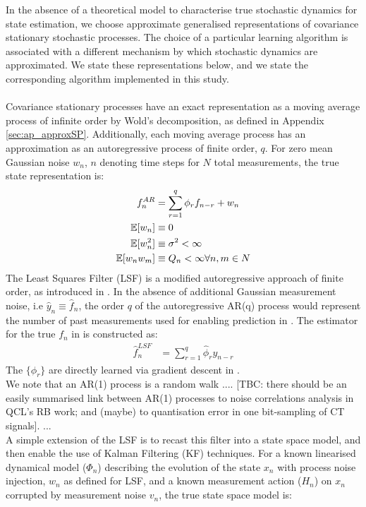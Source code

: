 In the absence of a theoretical model to characterise true stochastic dynamics for state estimation, we choose approximate generalised representations of covariance stationary stochastic processes. The choice of a particular learning algorithm is associated with a different mechanism by which stochastic dynamics are approximated. We state these representations below, and we state the corresponding algorithm implemented in this study. 
\\
\\
Covariance stationary processes have an exact representation as a moving average process of infinite order by Wold's decomposition, as defined in Appendix \ref{sec:ap_approxSP}. Additionally, each moving average process has an approximation as an autoregressive process of finite order, $q$. For zero mean Gaussian noise $w_n$, $n$ denoting time steps for $N$ total measurements, the true state representation is:
\begin{align}
f_n^{AR} & = \sum_{r=1}^{q} \phi_r f_{n-r}  + w_n\label{eqn:main:f_true_AR}  \\
\mathbb{E}[w_n] &\equiv 0 \\
\mathbb{E}[w_n^2] &\equiv \sigma^2 < \infty \\
\mathbb{E}[w_n w_m] &\equiv Q_n < \infty \forall n, m \in N
\end{align}
The Least Squares Filter (LSF) is a modified autoregressive approach of finite order, as introduced in \cite{mavadia2017}. In the absence of additional Gaussian measurement noise, i.e $\hat{y}_n \equiv \hat{f}_n$, the order $q$ of the autoregressive AR(q) process would represent the number of past measurements used for enabling prediction in \cite{mavadia2017}. The estimator for the true $f_n$ in \cite{mavadia2017} is constructed as:
\begin{align}
\hat{f}_n^{LSF} & = \sum_{r=1}^{q} \hat{\phi}_r y_{n-r} \label{eqn:main:f_hat_LSF} 
\end{align}
The $\{\phi_r\}$  are directly learned via gradient descent in \cite{mavadia2017}.
\\
We note that an AR(1) process is a random walk .... [TBC: there should be an easily summarised link between AR(1) processes to noise correlations analysis in QCL's RB work; and (maybe) to quantisation error in one bit-sampling of CT signals]. ... 
\\
A simple extension of the LSF is to recast this filter into a state space model, and then enable the use of Kalman Filtering (KF) techniques.
For a known linearised dynamical model ($\Phi_n$) describing the evolution of the state $x_n$ with process noise injection, $w_n$ as defined for LSF,  and a known measurement action ($H_n$) on $x_n$ corrupted by measurement noise $v_n$, the true state space model is:
